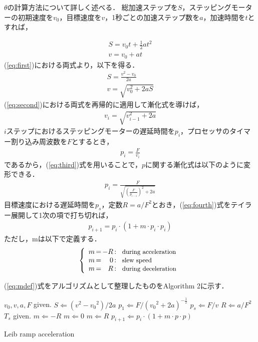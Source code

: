 \documentclass[twocolumn,oneside,a4paper]{article}
\begin{document}
$\theta$の計算方法について詳しく述べる．
総加速ステップを$S$，ステッピングモーターの初期速度を$v_0$，目標速度を$v$，1秒ごとの加速ステップ数を$a$，加速時間を$t$とすれば，

\begin{eqnarray}\label{eq:first}
     S = v_0 t + \frac{1}{2} a t^2 \nonumber \\
     v = v_0 + a t    
\end{eqnarray}
(\ref{eq:first})における両式より，以下を得る．
\begin{eqnarray}\label{eq:second}
     S = \frac{v^2-v_0}{2 a} \nonumber \\
     v = \sqrt{v_0^2+2aS}
\end{eqnarray}
(\ref{eq:second})における両式を再帰的に適用して漸化式を導けば，
\begin{eqnarray}\label{eq:third}
     v_i = \sqrt{v_{i-1}^2 + 2a}
\end{eqnarray}
$i$ステップにおけるステッピングモーターの遅延時間を$p_i$，プロセッサのタイマー割り込み周波数を$F$とするとき，
\begin{eqnarray*}
     p_i = \frac{F}{v_i}
\end{eqnarray*}
であるから，(\ref{eq:third})式を用いることで，$p$に関する漸化式は以下のように変形できる．
\begin{eqnarray}\label{eq:fourth}
     p_i = \frac{F}{\sqrt{{(\frac{F}{p_{i-1}})}^2+2a}}
\end{eqnarray}
目標速度における遅延時間を$p_s$，定数$R= a/F^2$とおき，(\ref{eq:fourth})式をテイラー展開して1次の項で打ち切れば，
\begin{eqnarray}\label{eq:pupdate}
     p_{i+1} = p_i \cdot (1 + m \cdot p_i \cdot p_i)
\end{eqnarray}
ただし，mは以下で定義する．
\begin{eqnarray}\label{eq:mdef}
\left\{
\begin{array}{r@{\,}c@{\,}r@{\,}c@{\,}l@{\;\;}r}
 m &=& -R &:& \:\:\: \mbox{\small during acceleration}\\
 m &=& 0 &:&  \:\:\: \mbox{\small slew speed}\\
 m &=& R &:&  \:\:\: \mbox{\small during deceleration}
\end{array}%
\right.
\end{eqnarray}

(\ref{eq:mdef})式をアルゴリズムとして整理したものをAlgorithm 2に示す．

\begin{algorithm}[h]        
\begin{algorithmic}                 
\STATE $v_0, v, a, F$ given.
\STATE $S \Leftarrow (v^2-{v_0}^2) / 2 a$
\STATE $p_1 \Leftarrow F / ({v_0}^2 + 2a)^{-\frac{1}{2}}$
\STATE $p_s \Leftarrow F/v$
\STATE $R \Leftarrow a / F^2$
\STATE $T_s$ given.
  \STATE $m \Leftarrow -R$
  \STATE $m \Leftarrow 0$
\ELSE
  \STATE $m \Leftarrow R$
\ENDIF
\STATE $p_{i+1} \Leftarrow p_i \cdot (1+m\cdot p \cdot p)$
\ENDFOR
\end{algorithmic}
\caption{Leib ramp acceleration}
\label{fig:leib_algorithm}                         
\end{algorithm}
\end{document}
